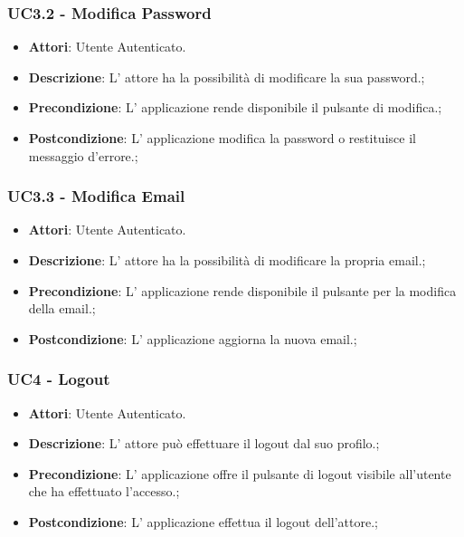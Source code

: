 \subsubsection{UC3.2 - Modifica Password} 
\label{sssec:UC3.2} 
\begin{itemize} 
\item \textbf{Attori}: Utente Autenticato.
\item \textbf{Descrizione}: L' attore ha la possibilità di modificare la sua password.;
\item \textbf{Precondizione}: L' applicazione rende disponibile il pulsante di modifica.;
\item \textbf{Postcondizione}: L' applicazione modifica la password o restituisce il messaggio d'errore.;
\end{itemize} 
\subsubsection{UC3.3 - Modifica Email} 
\label{sssec:UC3.3} 
\begin{itemize} 
\item \textbf{Attori}: Utente Autenticato.
\item \textbf{Descrizione}: L' attore ha la possibilità di modificare la propria email.;
\item \textbf{Precondizione}: L' applicazione rende disponibile il pulsante per la modifica della email.;
\item \textbf{Postcondizione}: L' applicazione aggiorna la nuova email.;
\end{itemize} 
\subsubsection{UC4 - Logout} 
\label{sssec:UC4} 
\begin{itemize} 
\item \textbf{Attori}: Utente Autenticato.
\item \textbf{Descrizione}: L' attore può effettuare il logout dal suo profilo.;
\item \textbf{Precondizione}: L' applicazione offre il pulsante di logout visibile all'utente che ha effettuato l'accesso.;
\item \textbf{Postcondizione}: L' applicazione effettua il logout dell'attore.;
\end{itemize} 
